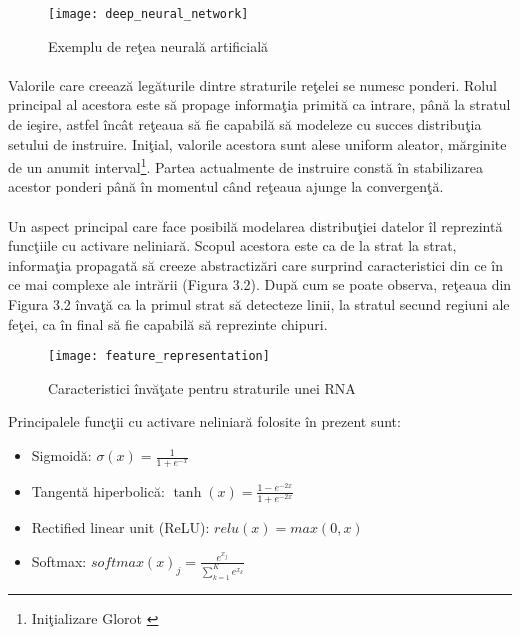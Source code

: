 \begin{figure}[H]
\centering
\texttt{[image: deep\_neural\_network]}
\caption{Exemplu de re\c tea neural\u a artificial\u a}
\end{figure}

\paragraph{}
Valorile care creeaz\u a leg\u aturile dintre straturile re\c telei se numesc ponderi. Rolul principal al acestora este s\u a propage informa\c tia primit\u a ca intrare, p\^ an\u a la stratul de ie\c sire, astfel \^ inc\^ at re\c teaua s\u a fie capabil\u a s\u a modeleze cu succes distribu\c tia setului de instruire. Ini\c tial, valorile acestora sunt alese uniform aleator, m\u arginite de un anumit interval\footnote{Ini\c tializare Glorot \cite{GlorotAISTATS2010}}. Partea actualmente de instruire const\u a \^ in stabilizarea acestor ponderi p\^ an\u a \^ in momentul c\^ and re\c teaua ajunge la convergen\c t\u a.

\paragraph{}
Un aspect principal care face posibil\u a modelarea distribu\c tiei datelor \^ il reprezint\u a func\c tiile cu activare neliniar\u a. Scopul acestora este ca de la strat la strat, informa\c tia propagat\u a s\u a creeze abstractiz\u ari care surprind caracteristici din ce \^ in ce mai complexe ale intr\u arii (Figura 3.2). Dup\u a cum se poate observa, re\c teaua din Figura 3.2 \^ inva\c t\u a ca la primul strat s\u a detecteze linii, la stratul secund regiuni ale fe\c tei, ca \^ in final s\u a fie capabil\u a s\u a reprezinte chipuri.

\begin{figure}[H]
\centering
\texttt{[image: feature\_representation]}
\caption{Caracteristici \^ inv\u a\c tate pentru straturile unei RNA}
\end{figure}

Principalele func\c tii cu activare neliniar\u a folosite \^ in prezent sunt:

\begin{itemize}
	\item Sigmoid\u a: \(\sigma(x)=\frac{1}{1+e^{-x}}\)
	\item Tangent\u a hiperbolic\u a: \(\tanh(x)=\frac{1-e^{-2x}}{1+e^{-2x}}\)
	\item Rectified linear unit (ReLU): \(relu(x)=max(0,x)\)
	\item Softmax: \(softmax(x)_j=\frac{e^{x_j}}{\sum_{k=1}^{K}e^{x_k}}\)
\end{itemize}

